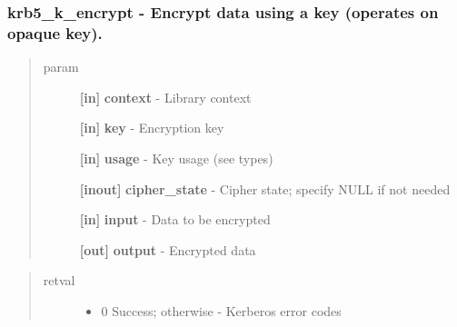 \documentclass[letterpaper,10pt,english]{sphinxmanual}
\begin{document}
\subsubsection{krb5\_k\_encrypt -  Encrypt data using a key (operates on opaque key).}
\label{appdev/refs/api/krb5_k_encrypt:krb5-k-encrypt-encrypt-data-using-a-key-operates-on-opaque-key}\label{appdev/refs/api/krb5_k_encrypt::doc}

\begin{fulllineitems}
\label{appdev/refs/api/krb5_k_encrypt:krb5_k_encrypt}
\end{fulllineitems}

\begin{quote}\begin{description}
\item[{param}] \leavevmode
\textbf{{[}in{]}} \textbf{context} - Library context

\textbf{{[}in{]}} \textbf{key} - Encryption key

\textbf{{[}in{]}} \textbf{usage} - Key usage (see  types)

\textbf{{[}inout{]}} \textbf{cipher\_state} - Cipher state; specify NULL if not needed

\textbf{{[}in{]}} \textbf{input} - Data to be encrypted

\textbf{{[}out{]}} \textbf{output} - Encrypted data

\end{description}\end{quote}
\begin{quote}\begin{description}
\item[{retval}] \leavevmode\begin{itemize}
\item {} 
0   Success; otherwise - Kerberos error codes

\end{itemize}

\end{description}\end{quote}
\end{document}
